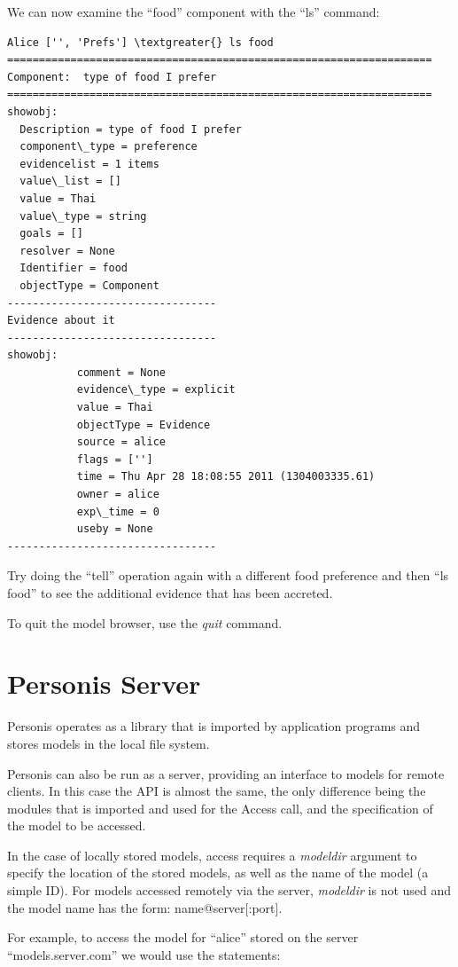 \documentclass[letterpaper,10pt,english]{sphinxmanual}
\begin{document}
We can now examine the ``food'' component with the ``ls'' command:

\begin{Verbatim}[commandchars=\\\{\}]
Alice ['', 'Prefs'] \textgreater{} ls food
===================================================================
Component:  type of food I prefer
===================================================================
showobj:
  Description = type of food I prefer
  component\_type = preference
  evidencelist = 1 items
  value\_list = []
  value = Thai
  value\_type = string
  goals = []
  resolver = None
  Identifier = food
  objectType = Component
---------------------------------
Evidence about it
---------------------------------
showobj:
           comment = None
           evidence\_type = explicit
           value = Thai
           objectType = Evidence
           source = alice
           flags = ['']
           time = Thu Apr 28 18:08:55 2011 (1304003335.61)
           owner = alice
           exp\_time = 0
           useby = None
---------------------------------
\end{Verbatim}

Try doing the ``tell'' operation again with a different food preference and then ``ls food'' to see the additional
evidence that has been accreted.

To quit the model browser, use the \emph{quit} command.


\chapter{Personis Server}
\label{Server::doc}\label{Server:personis-server}
Personis operates as a library that is imported by application programs and stores models in the local file
system.

Personis can also be run as a server, providing an interface to models for remote clients. In this case the API is almost the same, the only difference being the modules that is imported and used for the Access call, and the
specification of the model to be accessed.

In the case of locally stored models, access requires a \emph{modeldir} argument to specify the
location of the stored models, as well as the name of the model (a simple ID).
For models accessed remotely via the server, \emph{modeldir} is not used and the model name has the form:
name@server{[}:port{]}.

For example, to access the model for ``alice'' stored on the server ``models.server.com'' we
would use the statements:
\end{document}

